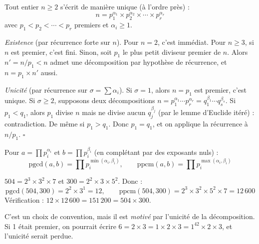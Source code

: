 \begin{thmbox}
Tout entier $n \geqslant 2$ s'écrit de manière unique (à l'ordre près) :
\[
  n = p_1^{\alpha_1} \times p_2^{\alpha_2} \times \cdots \times p_r^{\alpha_r}
\]
avec $p_1 < p_2 < \cdots < p_r$ premiers et $\alpha_i \geqslant 1$.
\end{thmbox}

\begin{proofbox}
\textit{Existence} (par récurrence forte sur $n$). Pour $n = 2$, c'est immédiat. Pour $n \geqslant 3$, si $n$ est premier, c'est fini. Sinon, soit $p_1$ le plus petit diviseur premier de $n$. Alors $n' = n/p_1 < n$ admet une décomposition par hypothèse de récurrence, et $n = p_1 \times n'$ aussi.

\textit{Unicité} (par récurrence sur $\sigma = \sum \alpha_i$). Si $\sigma = 1$, alors $n = p_1$ est premier, c'est unique. Si $\sigma \geqslant 2$, supposons deux décompositions $n = p_1^{\alpha_1} \cdots p_r^{\alpha_r} = q_1^{\beta_1} \cdots q_s^{\beta_s}$. Si $p_1 < q_1$, alors $p_1$ divise $n$ mais ne divise aucun $q_j^{\beta_j}$ (par le lemme d'Euclide itéré) : contradiction. De même si $p_1 > q_1$. Donc $p_1 = q_1$, et on applique la récurrence à $n/p_1$. \hfill$\square$
\end{proofbox}

\begin{methodbox}
Pour $a = \prod p_i^{\alpha_i}$ et $b = \prod p_i^{\beta_i}$ (en complétant par des exposants nuls) :
\[
  \text{pgcd}(a,b) = \prod p_i^{\min(\alpha_i, \beta_i)}, \qquad \text{ppcm}(a,b) = \prod p_i^{\max(\alpha_i, \beta_i)}
\]
\end{methodbox}

\begin{exbox}
$504 = 2^3 \times 3^2 \times 7$ et $300 = 2^2 \times 3 \times 5^2$. Donc :
\[
  \text{pgcd}(504, 300) = 2^2 \times 3^1 = 12, \qquad \text{ppcm}(504, 300) = 2^3 \times 3^2 \times 5^2 \times 7 = 12\,600
\]
Vérification : $12 \times 12\,600 = 151\,200 = 504 \times 300$. \checkmark
\end{exbox}

\begin{intuitionbox}
C'est un choix de convention, mais il est \emph{motivé} par l'unicité de la décomposition. Si 1 était premier, on pourrait écrire $6 = 2 \times 3 = 1 \times 2 \times 3 = 1^{42} \times 2 \times 3$, et l'unicité serait perdue.
\end{intuitionbox}



